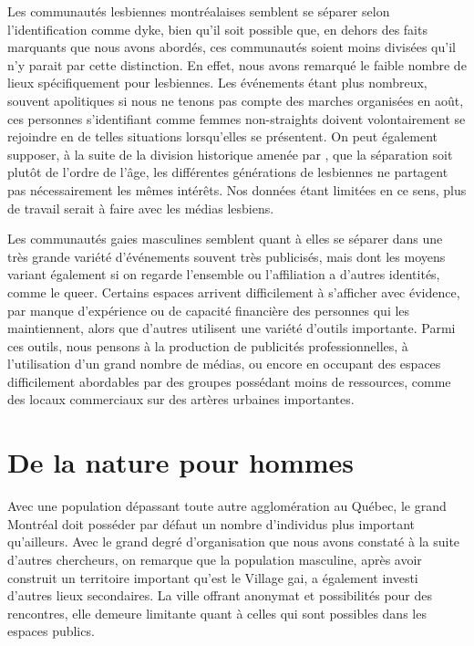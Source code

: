 Les communautés lesbiennes montréalaises semblent se séparer selon l'identification comme dyke, bien qu'il soit possible que, en dehors des faits marquants que nous avons abordés, ces communautés soient moins divisées qu'il n'y parait par cette distinction.
En effet, nous avons remarqué le faible nombre de lieux spécifiquement pour lesbiennes.
Les événements étant plus nombreux, souvent apolitiques si nous ne tenons pas compte des marches organisées en août, ces personnes s'identifiant comme femmes non-straights doivent volontairement se rejoindre en de telles situations lorsqu'elles se présentent.
On peut également supposer, à la suite de la division historique amenée par \citet{Giraud2014}, que la séparation soit plutôt de l'ordre de l'âge, les différentes générations de lesbiennes ne partagent pas nécessairement les mêmes intérêts.
Nos données étant limitées en ce sens, plus de travail serait à faire avec les médias lesbiens.

Les communautés gaies masculines semblent quant à elles se séparer dans une très grande variété d'événements souvent très publicisés, mais dont les moyens variant également si on regarde l'ensemble ou l'affiliation a d'autres identités, comme le queer.
Certains espaces arrivent difficilement à s'afficher avec évidence, par manque d'expérience ou de capacité financière des personnes qui les maintiennent, alors que d'autres utilisent une variété d'outils importante. 
Parmi ces outils, nous pensons à la production de publicités professionnelles, à l'utilisation d'un grand nombre de médias, ou encore en occupant des espaces difficilement abordables par des groupes possédant moins de ressources, comme des locaux commerciaux sur des artères urbaines importantes.

\section{De la nature pour hommes}
\label{sec:de_la_nature_pour_hommes}
Avec une population dépassant toute autre agglomération au Québec, le grand Montréal doit posséder par défaut un nombre d'individus \lgbt{} plus important qu'ailleurs.
Avec le grand degré d'organisation que nous avons constaté à la suite d'autres chercheurs, on remarque que la population masculine, après avoir construit un territoire important qu'est le Village gai, a également investi d'autres lieux secondaires.
La ville offrant anonymat et possibilités pour des rencontres, elle demeure limitante quant à celles qui sont possibles dans les espaces publics.

